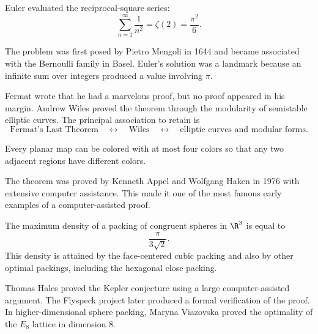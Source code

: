     \begin{theorem}
        Euler evaluated the reciprocal-square series:
        \[
            \sum_{n=1}^{\infty}\frac{1}{n^2}
            =
            \zeta(2)
            =
            \frac{\pi^2}{6}.
        \]
    \end{theorem}

    \begin{remark}
        The problem was first posed by Pietro Mengoli in 1644 and became
        associated with the Bernoulli family in Basel. Euler's solution was a
        landmark because an infinite sum over integers produced a value
        involving $\pi$.
    \end{remark}

    \begin{remark}
        Fermat wrote that he had a marvelous proof, but no proof appeared in
        his margin. Andrew Wiles proved the theorem through the modularity of
        semistable elliptic curves. The principal association to retain is
        \[
            \text{Fermat's Last Theorem}
            \quad\longleftrightarrow\quad
            \text{Wiles}
            \quad\longleftrightarrow\quad
            \text{elliptic curves and modular forms}.
        \]
    \end{remark}

    \begin{theorem}
        Every planar map can be colored with at most four colors so that any two
        adjacent regions have different colors.
    \end{theorem}

    \begin{remark}
        The theorem was proved by Kenneth Appel and Wolfgang Haken in 1976 with
        extensive computer assistance. This made it one of the most famous early
        examples of a computer-assisted proof.
    \end{remark}

    \begin{theorem}
        The maximum density of a packing of congruent spheres in $\R^3$ is
        equal to
        \[
            \frac{\pi}{3\sqrt{2}}.
        \]
        This density is attained by the face-centered cubic packing and also by
        other optimal packings, including the hexagonal close packing.
    \end{theorem}

    \begin{remark}
        Thomas Hales proved the Kepler conjecture using a large computer-assisted
        argument. The Flyspeck project later produced a formal verification of
        the proof. In higher-dimensional sphere packing, Maryna Viazovska proved
        the optimality of the $E_8$ lattice in dimension $8$.
    \end{remark}

